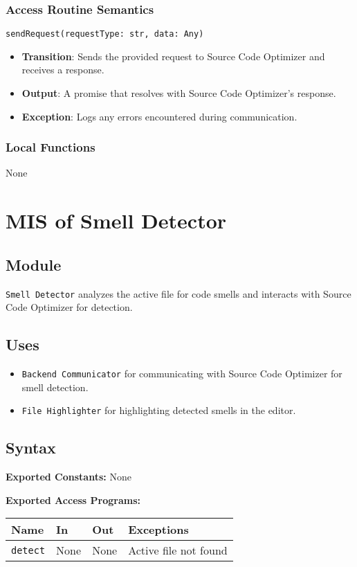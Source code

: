 \documentclass[12pt, titlepage]{article}
\begin{document}
\subsubsection{Access Routine Semantics}
\texttt{sendRequest(requestType: str, data: Any)}
\begin{itemize}
\item \textbf{Transition}: Sends the provided request to Source Code Optimizer and receives a response.
\item \textbf{Output}: A promise that resolves with Source Code Optimizer's response.
\item \textbf{Exception}: Logs any errors encountered during communication.
\end{itemize}

\subsubsection{Local Functions}
None

\section{MIS of Smell Detector}

\subsection{Module}
\texttt{Smell Detector} analyzes the active file for code smells and interacts with Source Code Optimizer for detection.

\subsection{Uses}
\begin{itemize}
\item \texttt{Backend Communicator} for communicating with Source Code Optimizer for smell detection.
\item \texttt{File Highlighter} for highlighting detected smells in the editor.
\end{itemize}

\subsection{Syntax}

\textbf{Exported Constants:} None

\textbf{Exported Access Programs:}\\
\begin{tabularx}{\linewidth}{|l|>{\raggedright\arraybackslash}X|l|l|}
  \hline
  \textbf{Name} & \textbf{In} & \textbf{Out} & \textbf{Exceptions} \\
  \hline
  \texttt{detect} & None & None & Active file not found \\
  \hline
\end{tabularx}
\end{document}
